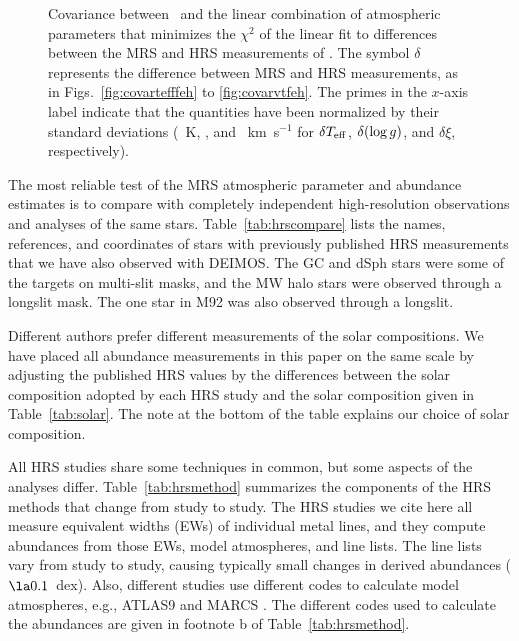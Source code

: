 \documentclass{emulateapj}
\begin{document}
\begin{figure}[p]
\begin{minipage}[t]{0.49\textwidth}
\caption{Covariance between \feh\ and the linear combination of
  atmospheric parameters that minimizes the $\chi^2$ of the linear fit
  to differences between the MRS and HRS measurements of \feh.  The
  symbol $\delta$ represents the difference between MRS and HRS
  measurements, as in Figs.~\ref{fig:covartefffeh} to
  \ref{fig:covarvtfeh}.  The primes in the $x$-axis label indicate
  that the quantities have been normalized by their standard
  deviations (\allteffdiffsigma~K, \allloggdiffsigma, and
  \allvtdiffsigma~km~s$^{-1}$ for $\delta T_{\rm eff}$,
  $\delta(\log g)$, and $\delta\xi$,
  respectively).\label{fig:leastsquares}}
\end{minipage}
\end{figure}

The most reliable test of the MRS atmospheric parameter and abundance
estimates is to compare with completely independent high-resolution
observations and analyses of the same stars.
Table~\ref{tab:hrscompare} lists the names, references, and
coordinates of stars with previously published HRS measurements that
we have also observed with DEIMOS.  The GC and dSph stars were some of
the targets on multi-slit masks, and the MW halo stars were observed
through a longslit mask.  The one star in M92 was also observed
through a longslit.

Different authors prefer different measurements of the solar
compositions.  We have placed all abundance measurements in this paper
on the same scale by adjusting the published HRS values by the
differences between the solar composition adopted by each HRS study
and the solar composition given in Table~\ref{tab:solar}.  The note at
the bottom of the table explains our choice of solar composition.

All HRS studies share some techniques in common, but some aspects of
the analyses differ.  Table~\ref{tab:hrsmethod} summarizes the
components of the HRS methods that change from study to study.  The
HRS studies we cite here all measure equivalent widths (EWs) of
individual metal lines, and they compute abundances from those EWs,
model atmospheres, and line lists.  The line lists vary from study to
study, causing typically small changes in derived abundances ($\la
0.1$~dex).  Also, different studies use different codes to calculate
model atmospheres, e.g., ATLAS9 \citep{kur93,cas04} and MARCS
\citep{gus75}.  The different codes used to calculate the abundances
are given in footnote b of Table~\ref{tab:hrsmethod}.
\end{document}
